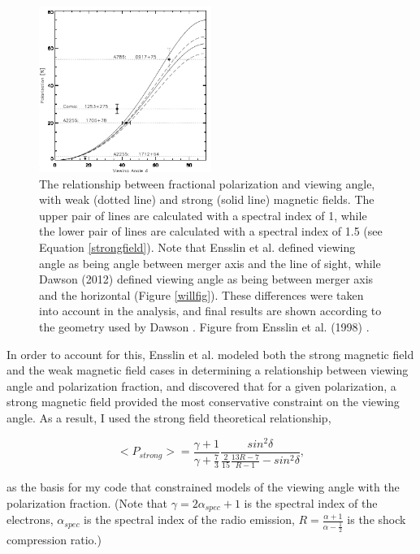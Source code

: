 \documentclass[12 pt]{article}
\renewcommand{\baselinestretch}{2}
\begin{document}
\renewcommand{\baselinestretch}{1}
\begin{figure}[h]
\caption{The relationship between fractional polarization and viewing angle, with weak (dotted line) and strong (solid line) magnetic fields. The upper pair of lines are calculated with a spectral index of 1, while the lower pair of lines are calculated with a spectral index of 1.5 (see Equation \ref{strongfield}). Note that Ensslin et al. defined viewing angle as being angle between merger axis and the line of sight, while Dawson (2012) defined viewing angle as being between merger axis and the horizontal (Figure \ref{willfig}). These differences were taken into account in the analysis, and final results are shown according to the geometry used by Dawson \cite{Dawson13}. Figure from Ensslin et al. (1998) \cite{Ensslin98}.}
\label{ensslin}
\centering
\includegraphics[width=0.5\textwidth]{ensslin_curves}
\end{figure}
\renewcommand{\baselinestretch}{2}

In order to account for this, Ensslin et al. modeled both the strong magnetic field and the weak magnetic field cases in determining a relationship between viewing angle and polarization fraction, and discovered that for a given polarization, a strong magnetic field provided the most conservative constraint on the viewing angle. As a result, I used the strong field theoretical relationship, 

\renewcommand{\baselinestretch}{1}
\begin{equation}
\label{strongfield}
<P_{strong}> = \frac{\gamma + 1}{\gamma + \frac{7}{3}} \frac{sin^2 \delta}{\frac{2}{15} \frac{13R-7}{R-1} -sin^2 \delta},
\end{equation} 
\renewcommand{\baselinestretch}{1}

as the basis for my code that constrained models of the viewing angle with the polarization fraction. (Note that $\gamma = 2\alpha_{spec} + 1$ is the spectral index of the electrons, $\alpha_{spec}$ is the spectral index of the radio emission, $R=\frac{\alpha + 1}{\alpha - \frac{1}{2}}$ is the shock compression ratio.)
\end{document}
